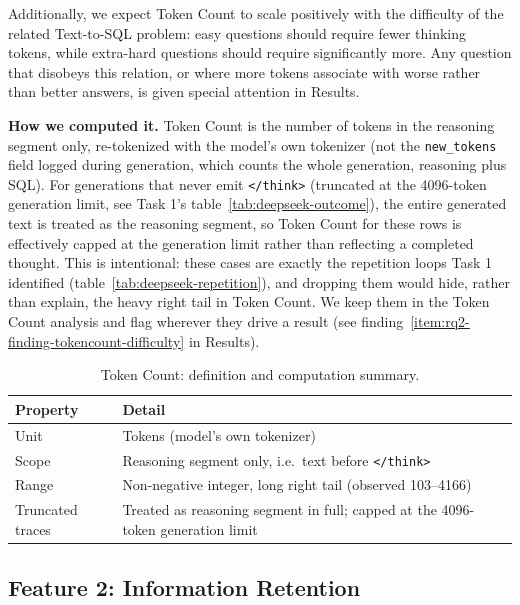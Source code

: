 Additionally, we expect Token Count to scale positively with the difficulty of the related Text-to-SQL problem: easy questions should require fewer thinking tokens, while extra-hard questions should require significantly more. Any question that disobeys this relation, or where more tokens associate with worse rather than better answers, is given special attention in Results.

\textbf{How we computed it.} Token Count is the number of tokens in the reasoning segment only, re-tokenized with the model's own tokenizer (not the \texttt{new\_tokens} field logged during generation, which counts the whole generation, reasoning plus SQL). For generations that never emit \texttt{</think>} (truncated at the 4096-token generation limit, see Task 1's table~\ref{tab:deepseek-outcome}), the entire generated text is treated as the reasoning segment, so Token Count for these rows is effectively capped at the generation limit rather than reflecting a completed thought. This is intentional: these cases are exactly the repetition loops Task 1 identified (table~\ref{tab:deepseek-repetition}), and dropping them would hide, rather than explain, the heavy right tail in Token Count. We keep them in the Token Count analysis and flag wherever they drive a result (see finding~\ref{item:rq2-finding-tokencount-difficulty} in Results).

\begin{table}[H]
\centering
\footnotesize
\caption{Token Count: definition and computation summary.}
\label{tab:rq2-feature-tokencount-summary}
\begin{tabular}{p{}p{}}
\toprule
Property & Detail \\
\midrule
Unit & Tokens (model's own tokenizer) \\
Scope & Reasoning segment only, i.e.\ text before \texttt{</think>} \\
Range & Non-negative integer, long right tail (observed 103--4166) \\
Truncated traces & Treated as reasoning segment in full; capped at the 4096-token generation limit \\
\bottomrule
\end{tabular}
\end{table}

\subsection{Feature 2: Information Retention}
\label{sec:rq2-feature-retention}

